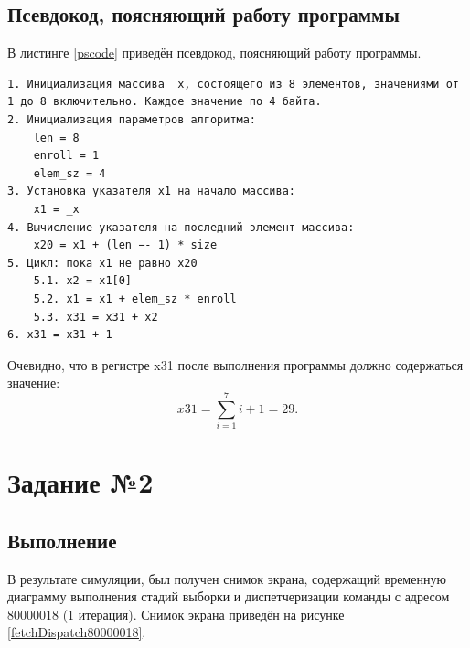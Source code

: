 \documentclass[12pt]{report}
\begin{document}
\section{Псевдокод, поясняющий работу программы}
В листинге \ref{pscode} приведён псевдокод, поясняющий работу программы.
\begin{lstlisting}[extendedchars=\true, keepspaces=true, escapechar=\%,
  texcl=\true, label=pscode,caption=Псевдокод, поясняющий работу программы]
1. Инициализация массива _x, состоящего из 8 элементов, значениями от 1 до 8 включительно. Каждое значение по 4 байта.
2. Инициализация параметров алгоритма:
	len = 8
	enroll = 1 
	elem_sz = 4
3. Установка указателя x1 на начало массива:
	x1 = _x
4. Вычисление указателя на последний элемент массива:
	x20 = x1 + (len −- 1) * size
5. Цикл: пока x1 не равно x20
	5.1. x2 = x1[0]
	5.2. x1 = x1 + elem_sz * enroll
	5.3. x31 = x31 + x2
6. x31 = x31 + 1
\end{lstlisting}

Очевидно, что в регистре x31 после выполнения программы должно содержаться значение:
\begin{displaymath}
x31 = \sum\limits_{i=1}^7{i} + 1 = 29.
\end{displaymath}
\newpage
\chapter{Задание №2}
\section{Выполнение}
В результате симуляции, был получен снимок экрана, содержащий временную диаграмму выполнения стадий выборки и диспетчеризации команды с адресом 80000018 (1 итерация). Снимок экрана приведён на рисунке \ref{fetchDispatch80000018}.
\end{document}
